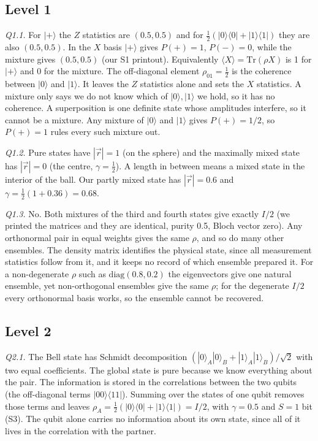 \documentclass[10pt]{article}
\newcommand{\tr}{\mathrm{Tr}}
\newcommand{\lab}[1]{\noindent\textit{#1}\;}
\begin{document}
\subsection*{Level 1}
\lab{Q1.1.} For $|+\rangle$ the $Z$ statistics are $(0.5,0.5)$ and for $\tfrac12(|0\rangle\langle0|+|1\rangle\langle1|)$ they are also $(0.5,0.5)$. In the $X$ basis $|+\rangle$ gives $P(+)=1$, $P(-)=0$, while the mixture gives $(0.5,0.5)$ (our S1 printout). Equivalently $\langle X\rangle=\tr(\rho X)$ is 1 for $|+\rangle$ and 0 for the mixture. The off-diagonal element $\rho_{01}=\tfrac12$ is the coherence between $|0\rangle$ and $|1\rangle$. It leaves the $Z$ statistics alone and sets the $X$ statistics. A mixture only says we do not know which of $|0\rangle,|1\rangle$ we hold, so it has no coherence. A superposition is one definite state whose amplitudes interfere, so it cannot be a mixture. Any mixture of $|0\rangle$ and $|1\rangle$ gives $P(+)=1/2$, so $P(+)=1$ rules every such mixture out.

\lab{Q1.2.} Pure states have $|\vec r|=1$ (on the sphere) and the maximally mixed state has $|\vec r|=0$ (the centre, $\gamma=\tfrac12$). A length in between means a mixed state in the interior of the ball. Our partly mixed state has $|\vec r|=0.6$ and $\gamma=\tfrac12(1+0.36)=0.68$.

\lab{Q1.3.} No. Both mixtures of the third and fourth states give exactly $I/2$ (we printed the matrices and they are identical, purity 0.5, Bloch vector zero). Any orthonormal pair in equal weights gives the same $\rho$, and so do many other ensembles. The density matrix identifies the physical state, since all measurement statistics follow from it, and it keeps no record of which ensemble prepared it. For a non-degenerate $\rho$ such as $\mathrm{diag}(0.8,0.2)$ the eigenvectors give one natural ensemble, yet non-orthogonal ensembles give the same $\rho$; for the degenerate $I/2$ every orthonormal basis works, so the ensemble cannot be recovered.

\subsection*{Level 2}
\lab{Q2.1.} The Bell state has Schmidt decomposition $(|0\rangle_A|0\rangle_B+|1\rangle_A|1\rangle_B)/\sqrt2$ with two equal coefficients. The global state is pure because we know everything about the pair. The information is stored in the correlations between the two qubits (the off-diagonal terms $|00\rangle\langle11|$). Summing over the states of one qubit removes those terms and leaves $\rho_A=\tfrac12(|0\rangle\langle0|+|1\rangle\langle1|)=I/2$, with $\gamma=0.5$ and $S=1$ bit (S3). The qubit alone carries no information about its own state, since all of it lives in the correlation with the partner.
\end{document}
